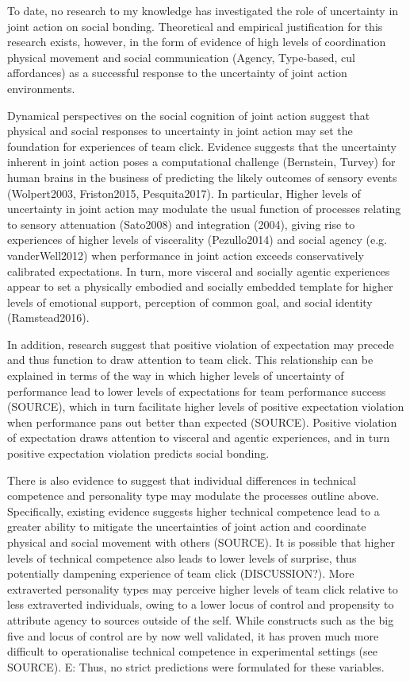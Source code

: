 \begin{CJK}{UTF8}{gbsn}
To date, no research to my knowledge has investigated the role of uncertainty in joint action on social bonding.  Theoretical and empirical justification for this research exists, however, in the form of evidence of high levels of coordination physical movement \citep[e.g.,][]{Richardson2012,Passos2011} and social communication \citep{} (Agency, Type-based, cul affordances) as a successful response to the uncertainty of joint action environments.

Dynamical perspectives on the social cognition of joint action suggest that physical and social responses to uncertainty in joint action may set the foundation for experiences of team click.  Evidence suggests that the uncertainty inherent in joint action poses a computational challenge (Bernstein, Turvey) for human brains in the business of predicting the likely outcomes of sensory events (Wolpert2003, Friston2015, Pesquita2017).  In particular, Higher levels of uncertainty in joint action may modulate the usual function of processes relating to sensory attenuation (Sato2008) and integration (2004), giving rise to experiences of higher levels of viscerality (Pezullo2014) and social agency (e.g. vanderWell2012) when performance in joint action exceeds conservatively calibrated expectations. In turn, more visceral and socially agentic experiences appear to set a physically embodied and socially embedded template for higher levels of emotional support, perception of common goal, and social identity (Ramstead2016).

In addition, research suggest that positive violation of expectation may precede and thus function to draw attention to team click. This relationship can be explained in terms of the way in which higher levels of uncertainty of performance lead to lower levels of expectations for team performance success (SOURCE), which in turn facilitate higher levels of positive expectation violation when performance pans out better than expected (SOURCE).  Positive violation of expectation draws attention to visceral and agentic experiences, and in turn positive expectation violation predicts social bonding.

There is also evidence to suggest that individual differences in technical competence and personality type may modulate the processes outline above. Specifically, existing evidence suggests higher technical competence lead to a greater ability to mitigate the uncertainties of joint action and coordinate physical and social movement with others (SOURCE). It is possible that higher levels of technical competence also leads to lower levels of surprise, thus potentially dampening experience of team click (DISCUSSION?).  More extraverted personality types may perceive higher levels of team click relative to less extraverted individuals, owing to a lower locus of control and propensity to attribute agency to sources outside of the self.  While constructs such as the big five and locus of control are by now well validated, it has proven much more difficult to operationalise technical competence in experimental settings (see SOURCE).
E: Thus, no strict predictions were formulated for these variables.


\end{CJK}
